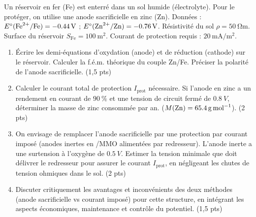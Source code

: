 \documentclass[11pt]{article}
\begin{document}
\begin{exercice}
Un réservoir en fer (Fe) est enterré dans un sol humide (électrolyte). Pour le protéger, on utilise une anode sacrificielle en zinc (Zn). Données : $E^\circ(\ce{Fe^{2+}/Fe}) = \SI{-0,44}{V}$ ; $E^\circ(\ce{Zn^{2+}/Zn}) = \SI{-0,76}{V}$. Résistivité du sol $\rho = \SI{50}{\ohm\meter}$. Surface du réservoir $S_{\text{Fe}} = \SI{100}{\square\meter}$. Courant de protection requis : $\SI{20}{\milli\ampere\per\square\meter}$.
\begin{enumerate}
    \item Écrire les demi-équations d'oxydation (anode) et de réduction (cathode) sur le réservoir. Calculer la f.é.m. théorique du couple Zn/Fe. Préciser la polarité de l'anode sacrificielle. (1,5 pts)
    \item Calculer le courant total de protection $I_{\text{prot}}$ nécessaire. Si l'anode en zinc a un rendement en courant de $\SI{90}{\%}$ et une tension de circuit fermé de $\SI{0,8}{V}$, déterminer la masse de zinc consommée par an. ($M(\ce{Zn}) = \SI{65,4}{g.mol^{-1}}$). (2 pts)
    \item On envisage de remplacer l'anode sacrificielle par une protection par courant imposé (anodes inertes en /MMO alimentées par redresseur). L'anode inerte a une surtension à l'oxygène de $\SI{0,5}{V}$. Estimer la tension minimale que doit délivrer le redresseur pour assurer le courant $I_{\text{prot}}$, en négligeant les chutes de tension ohmiques dans le sol. (2 pts)
    \item Discuter critiquement les avantages et inconvénients des deux méthodes (anode sacrificielle vs courant imposé) pour cette structure, en intégrant les aspects économiques, maintenance et contrôle du potentiel. (1,5 pts)
\end{enumerate}
\end{exercice}
\end{document}

